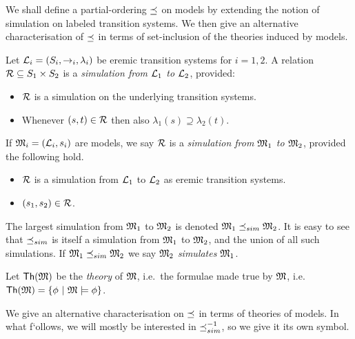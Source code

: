 We shall define a partial-ordering $\preceq$ on models by extending
the notion of simulation on labeled transition systems. We then give
an alternative characterisation of $\preceq$ in terms of
set-inclusion of the theories induced by models.

\begin{definition}
Let $\mathcal{L}_i = (S_i, \rightarrow_i, \lambda_i)$ be eremic transition
systems for $i = 1, 2$.  A relation $\mathcal{R} \subseteq S_1 \times S_2$ is
a \emph{simulation from $\mathcal{L}_1$ to $\mathcal{L}_2$}, provided:
\begin{itemize} 

\item $\mathcal{R}$ is a simulation on the underlying transition systems. 

\item Whenever $(s, t) \in \mathcal{R}$ then also $\lambda_1(s) \supseteq
  \lambda_2(t)$.

\end{itemize}

\NI If $\frak{M}_i = (\mathcal{L}_i, s_i)$ are models, we say $\mathcal{R}$ is a
\emph{simulation from $\frak{M}_1$ to $\frak{M}_2$}, provided the following hold.

\begin{itemize}

\item $\mathcal{R}$ is a simulation from $\mathcal{L}_1$ to $\mathcal{L}_2$ as eremic transition systems.

\item  $(s_1, s_2) \in \mathcal{R}$. 

\end{itemize}
\end{definition}

\begin{definition}
The largest simulation from $\frak{M}_1$ to $\frak{M}_2$ is denoted $\frak{M}_1
\preceq_{sim} \frak{M}_2$.  It is easy to see that $\preceq_{sim}$ is itself a
simulation from $\frak{M}_1$ to $\frak{M}_2$, and the union of all such
simulations.  If $\frak{M}_1 \preceq_{sim} \frak{M}_2$ we say $\frak{M}_2$
\emph{simulates} $\frak{M}_1$.
\end{definition}

\begin{definition}
Let $\mathsf{Th}(\frak{M})$ be the \emph{theory} of $\frak{M}$, i.e.~the formulae
made true by $\frak{M}$, i.e.~$\mathsf{Th}(\frak{M}) = \{\phi\ |\ \frak{M} \models
\phi \}$.
\end{definition}

\NI We give an alternative characterisation on $\preceq$ in terms of
theories of models. In what f`ollows, we will mostly be interested in
$\preceq_{sim}^{-1}$, so we give it its own symbol.

